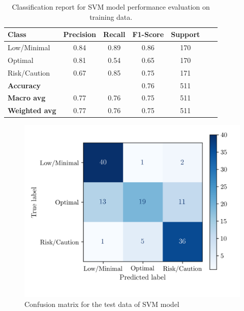 \documentclass[conference]{IEEEtran}
\begin{document}
\begin{table}[H]
\centering
\caption{Classification report for SVM model performance evaluation on training data.}
\label{crTrainSVM}
\begin{tabular}{lcccccc}
\toprule
\textbf{Class} & \textbf{Precision} & \textbf{Recall} & \textbf{F1-Score} & \textbf{Support} \\
\midrule
Low/Minimal & 0.84 & 0.89 & 0.86 & 170 \\
Optimal & 0.81 & 0.54 & 0.65 & 170 \\
Risk/Caution & 0.67 & 0.85 & 0.75 & 171 \\
\midrule
\textbf{Accuracy} &  &  & 0.76 & 511 \\
\textbf{Macro avg} & 0.77 & 0.76 & 0.75 & 511 \\
\textbf{Weighted avg} & 0.77 & 0.76 & 0.75 & 511 \\
\bottomrule
\end{tabular}
\end{table}

\begin{figure}[H]
    \centering
    \includegraphics[width=1\linewidth]{assets/SVM_ConfusionMatrixTest.png}
    \caption{Confusion matrix for the test data of SVM model}
    \label{svm_cm_test}
\end{figure}
\end{document}
